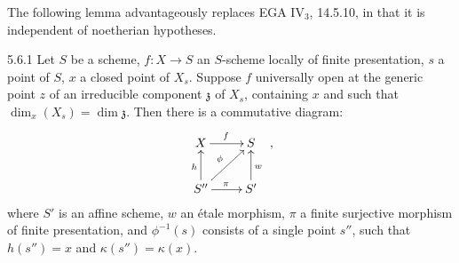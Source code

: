 The following lemma advantageously replaces EGA IV$_3$, 14.5.10, in that it is independent of noetherian hypotheses.
\begin{lemma}{5.6.1}\label{VIB.5.6.1}
Let $S$ be a scheme, $f:X\to S$ an $S$-scheme locally of finite presentation, $s$ a point of $S$, $x$ a closed point of $X_s$. Suppose $f$ universally open at the generic point $z$ of an irreducible component $\mathfrak z$ of $X_s$, containing $x$ and such that $\dim_x(X_s)=\dim\mathfrak z$. Then there is a commutative diagram:
\[
\xymatrix{X\ar[r]^f&S\\S''\ar[u]^h\ar[ur]^\phi\ar[r]^\pi&S'\ar[u]_w}\ ,
\]
where $S'$ is an affine scheme, $w$ an étale morphism, $\pi$ a finite surjective morphism of finite presentation, and $\phi^{-1}(s)$ consists of a single point $s''$, such that $h(s'')=x$ and $\kappa(s'')=\kappa(x)$.
\end{lemma}

